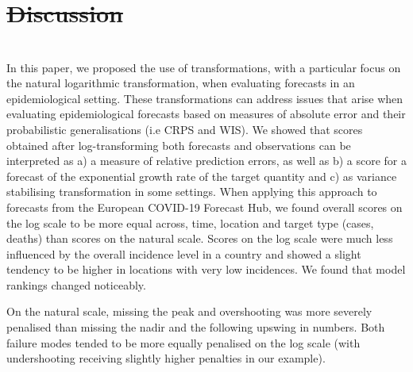 \documentclass[10pt,letterpaper]{article} %
\providecommand{\DIFaddtex}[1]{{\protect\color{blue}\uwave{#1}}} %
\providecommand{\DIFdeltex}[1]{{\protect\color{red}\sout{#1}}}                      %
\providecommand{\DIFaddbegin}{} %
\providecommand{\DIFaddend}{} %
\providecommand{\DIFdelbegin}{} %
\providecommand{\DIFdelend}{} %
\providecommand{\DIFadd}[1]{\texorpdfstring{\DIFaddtex{#1}}{#1}} %
\providecommand{\DIFdel}[1]{\texorpdfstring{\DIFdeltex{#1}}{}} %
\newcommand{\DIFscaledelfig}{0.5}
\newlength{\DIFdelgraphicswidth} %
\newlength{\DIFdelgraphicsheight} %
\newcommand{\DIFaddincludegraphics}[2][]{{\color{blue}\fbox{\DIFOincludegraphics[#1]{#2}}}} %
\newcommand{\DIFdelincludegraphics}[2][]{%
\sbox{\DIFdelgraphicsbox}{\DIFOincludegraphics[#1]{#2}}%
\settoboxwidth{\DIFdelgraphicswidth}{\DIFdelgraphicsbox} %
\settoboxtotalheight{\DIFdelgraphicsheight}{\DIFdelgraphicsbox} %
\scalebox{\DIFscaledelfig}{%
\parbox[b]{\DIFdelgraphicswidth}{\usebox{\DIFdelgraphicsbox}\\[-\baselineskip] \rule{\DIFdelgraphicswidth}{0em}}\llap{\resizebox{\DIFdelgraphicswidth}{\DIFdelgraphicsheight}{%
\setlength{\unitlength}{\DIFdelgraphicswidth}%
\begin{picture}(1,1)%
\thicklines\linethickness{2pt} %
{\color[rgb]{1,0,0}\put(0,0){\framebox(1,1){}}}%
{\color[rgb]{1,0,0}\put(0,0){\line( 1,1){1}}}%
{\color[rgb]{1,0,0}\put(0,1){\line(1,-1){1}}}%
\end{picture}%
}\hspace*{3pt}}} %
} %
\DeclareRobustCommand{\DIFaddbegin}{\DIFOaddbegin \let\includegraphics\DIFaddincludegraphics} %
\DeclareRobustCommand{\DIFaddend}{\DIFOaddend \let\includegraphics\DIFOincludegraphics} %
\DeclareRobustCommand{\DIFdelbegin}{\DIFOdelbegin \let\includegraphics\DIFdelincludegraphics} %
\DeclareRobustCommand{\DIFdelend}{\DIFOaddend \let\includegraphics\DIFOincludegraphics} %
\begin{document}
\DIFdelbegin \section{\DIFdel{Discussion}}
\addtocounter{section}{-1}%
\DIFdelend \DIFaddbegin \section*{\DIFadd{Discussion}}
\DIFaddend \label{sec:discussion}

In this paper, we proposed the use of transformations, with a particular focus on the natural logarithmic transformation, when evaluating forecasts in an epidemiological setting. These transformations can address issues that arise when evaluating epidemiological forecasts based on measures of absolute error and their probabilistic generalisations (i.e CRPS and WIS). We showed that scores obtained after log-transforming both forecasts and observations can be interpreted as a) a measure of relative prediction errors, as well as b) a score for a forecast of the exponential growth rate of the target quantity and c) as variance stabilising transformation in some settings.
When applying this approach to forecasts from the European COVID-19 Forecast Hub, we found overall scores on the log scale to be more equal across, time, location and target type (cases, deaths) than scores on the natural scale. Scores on the log scale were much less influenced by the overall incidence level in a country and showed a slight tendency to be higher in locations with very low incidences. We found that model rankings changed noticeably. 

On the natural scale, missing the peak and overshooting was more severely penalised than missing the nadir and the following upswing in numbers. Both failure modes tended to be more equally penalised on the log scale (with undershooting receiving slightly higher penalties in our example). 
\end{document}
